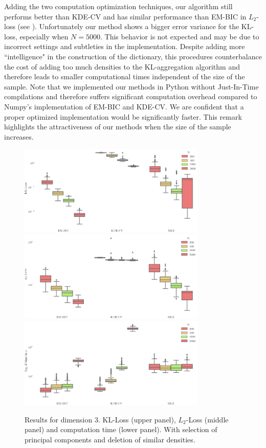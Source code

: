 Adding the two computation optimization techniques, our algorithm still performs better than KDE-CV and has similar performance than EM-BIC in $L_2$-loss (see  ). Unfortunately our method shows a bigger error variance for the KL-loss, especially when $N=5000$. This behavior is not expected and may be due to incorrect settings and subtleties in the implementation. Despite adding more  ``intelligence" in the construction of the dictionary, this procedures counterbalance the cost of adding too much densities to the KL-aggregation algorithm and therefore leads to smaller computational times independent of the size of the sample. Note that we implemented our methods in Python without Just-In-Time compilations and therefore suffers significant computation overhead compared to Numpy's implementation of EM-BIC and KDE-CV. We are confident that a proper optimized implementation would be significantly faster. This remark highlights the attractiveness of our methods when the size of the sample increases.
\begin{figure}
\center
    \includegraphics[width=0.8\textwidth]{./TeX_files/dict_gen_loss_dim_3_KL_gof_pc_select.png} 
    \includegraphics[width=0.8\textwidth]{./TeX_files/dict_gen_loss_dim_3_L2_gof_pc_select.png}
    \includegraphics[width=0.8\textwidth]{./TeX_files/dict_gen_time_dim_3_gof_pc_select.png}
    \caption{Results for dimension 3. KL-Loss (upper panel), $L_2$-Loss (middle panel) and computation time (lower panel). With selection of principal components and deletion of similar densities.}
    \label{fig:result_dict_gen_dim_3_gof_pc_select}
\end{figure}
